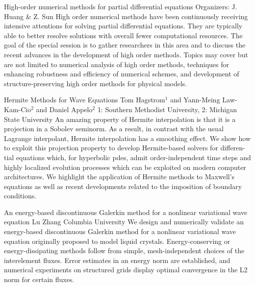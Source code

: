 \label{mini10}

\miniabs
{High-order numerical methods for partial differential equations}
{Organizers: J. Huang \& Z. Sun}
{High order numerical methods have been continuously receiving intensive attentions for solving partial differential equations. They are typically able to better resolve solutions with overall fewer computational resources. The goal of the special session is to gather researchers in this area and to discuss the recent advances in the development of high order methods. Topics may cover but are not limited to numerical analysis of high order methods, techniques for enhancing robustness and efficiency of numerical schemes, and development of structure-preserving high order methods for physical models.}

\vspace{2ex}
\abs
{Hermite Methods for Wave Equations}
{Tom Hagstrom$^{1}$ and Yann-Meing Law-Kam-Cio$^{2}$ and Daniel Appelo$^{2}$}
{1: Southern Methodist University, 2: Michigan State University}
{An amazing property of Hermite interpolation is that it is a projection in a Sobolev seminorm. As a result, in contrast with the usual Lagrange interpolant, Hermite interpolation has a smoothing effect. We show how to exploit this projection property to develop Hermite-based solvers for differen- tial equations which, for hyperbolic pdes, admit order-independent time steps and highly localized evolution processes which can be exploited on modern computer architectures. We highlight the application of Hermite methods to Maxwell’s equations as well as recent developments related to the imposition of boundary conditions.}


\vspace{1.5ex}
\abs
{An energy-based discontinuous Galerkin method for a nonlinear variational wave equation}
{Lu Zhang}
{Columbia University}
{We design and numerically validate an energy-based discontinuous Galerkin method for a nonlinear variational wave equation originally proposed to model liquid crystals. Energy-conserving or energy-dissipating methods follow from simple, mesh-independent choices of the interelement fluxes. Error estimates in an energy norm are established, and numerical experiments on structured grids display optimal convergence in the L2 norm for certain fluxes.}


